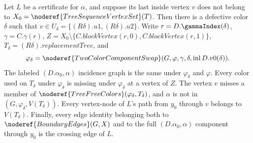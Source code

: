 \begin{helper}
Let $L$ be a  certificate for $\alpha$, and
suppose its last inside vertex $v$ does not belong to
$X_0=\noderef{TreeSequenceVertexSet}(T)$.  Then there is a defective
color $\delta$ such that $v\in U_\delta=\{(R\delta).u1,(R\delta).u2\}$.
Write $r=D.\gammaIndex(\delta)$,
$\gamma=C.\gamma(r)$,
$Z=X_0\setminus\{C.\mathit{blockVertex}(r,0),
C.\mathit{blockVertex}(r,1)\}$,
$T_\delta=(R\delta).\mathit{replacementTree}$, and
\[
 \varphi_\delta=\noderef{TwoColorComponentSwap}
   (G,\varphi,\gamma,\delta,\operatorname{inl}D.v0(\delta)).
\]
The labeled $(D.\alpha_0,\alpha)$ incidence graph is the same under
$\varphi_\delta$ and $\varphi$.  Every color used on $T_\delta$ under
$\varphi_\delta$ is missing under $\varphi_\delta$ at a vertex of $Z$.
The vertex $v$ misses a member of
$\noderef{TreeFreeColors}(\varphi_\delta,T_\delta)$, and $\alpha$ is not
in $(G,\varphi_\delta,V(T_\delta))$.
Every vertex-node of $L$'s path from $y_0$ through $v$ belongs to
$V(T_\delta)$.  Finally, every edge identity belonging both to
$\noderef{BoundaryEdges}(G,X)$ and to the full
$(D.\alpha_0,\alpha)$ component through $y_0$ is the crossing edge of
$L$.
\end{helper}
